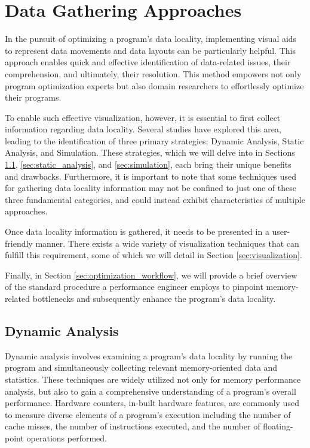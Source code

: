 \section{Data Gathering Approaches}\label{sec:methods}
In the pursuit of optimizing a program's data locality, implementing visual aids to represent data movements and data layouts can be particularly helpful. This approach enables quick and effective identification of data-related issues, their comprehension, and ultimately, their resolution. This method empowers not only program optimization experts but also domain researchers to effortlessly optimize their programs.

To enable such effective visualization, however, it is essential to first collect information regarding data locality. Several studies have explored this area, leading to the identification of three primary strategies: Dynamic Analysis, Static Analysis, and Simulation. These strategies, which we will delve into in Sections \ref{sec:dynamic_analysis}, \ref{sec:static_analysis}, and \ref{sec:simulation}, each bring their unique benefits and drawbacks. Furthermore, it is important to note that some techniques used for gathering data locality information may not be confined to just one of these three fundamental categories, and could instead exhibit characteristics of multiple approaches.

Once data locality information is gathered, it needs to be presented in a user-friendly manner. There exists a wide variety of visualization techniques that can fulfill this requirement, some of which we will detail in Section \ref{sec:visualization}.

Finally, in Section \ref{sec:optimization_workflow}, we will provide a brief overview of the standard procedure a performance engineer employs to pinpoint memory-related bottlenecks and subsequently enhance the program's data locality.

\subsection{Dynamic Analysis}\label{sec:dynamic_analysis}
Dynamic analysis involves examining a program's data locality by running the program and simultaneously collecting relevant memory-oriented data and statistics. These techniques are widely utilized not only for memory performance analysis, but also to gain a comprehensive understanding of a program's overall performance. Hardware counters, in-built hardware features, are commonly used to measure diverse elements of a program's execution including the number of cache misses, the number of instructions executed, and the number of floating-point operations performed.


